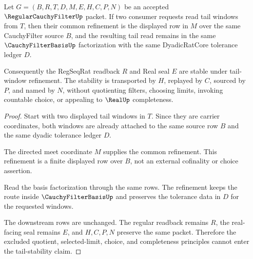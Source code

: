 \begin{theorem}
\label{thm:regularcauchyfilter-tail-stability}
Let $G=(B,R,T,D,M,E,H,C,P,N)$ be an accepted $\RegularCauchyFilterUp$ packet. If two consumer requests read tail windows from $T$, then their common refinement is the displayed row in $M$ over the same CauchyFilter source $B$, and the resulting tail read remains in the same $\CauchyFilterBasisUp$ factorization with the same DyadicRatCore tolerance ledger $D$.

Consequently the RegSeqRat readback $R$ and Real seal $E$ are stable under tail-window refinement. The stability is transported by $H$, replayed by $C$, sourced by $P$, and named by $N$, without quotienting filters, choosing limits, invoking countable choice, or appealing to $\RealUp$ completeness.
\end{theorem}
\begin{proof}
Start with two displayed tail windows in $T$. Since they are carrier coordinates, both windows are already attached to the same source row $B$ and the same dyadic tolerance ledger $D$.

The directed meet coordinate $M$ supplies the common refinement. This refinement is a finite displayed row over $B$, not an external cofinality or choice assertion.

Read the basis factorization through the same rows. The refinement keeps the route inside $\CauchyFilterBasisUp$ and preserves the tolerance data in $D$ for the requested windows.

The downstream rows are unchanged. The regular readback remains $R$, the real-facing seal remains $E$, and $H,C,P,N$ preserve the same packet. Therefore the excluded quotient, selected-limit, choice, and completeness principles cannot enter the tail-stability claim.
\end{proof}

